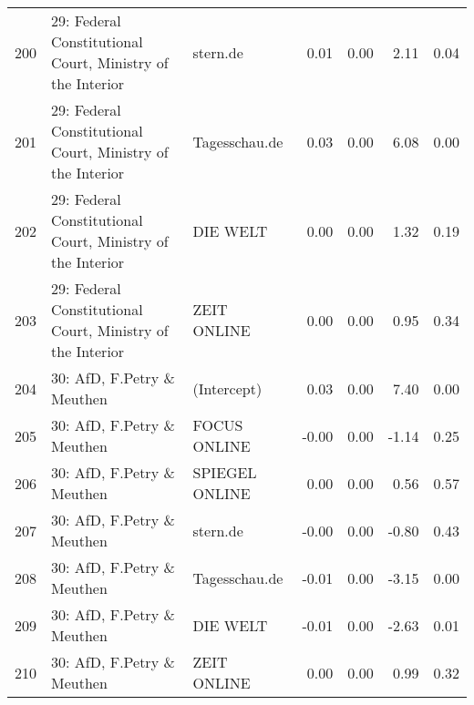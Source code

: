 \begin{table}[ht]
{\begin{tabular}{rllrrrr}
  200 & 29: Federal Constitutional Court, Ministry of the Interior & stern.de & 0.01 & 0.00 & 2.11 & 0.04 \\ 
  201 & 29: Federal Constitutional Court, Ministry of the Interior & Tagesschau.de & 0.03 & 0.00 & 6.08 & 0.00 \\ 
  202 & 29: Federal Constitutional Court, Ministry of the Interior & DIE WELT & 0.00 & 0.00 & 1.32 & 0.19 \\ 
  203 & 29: Federal Constitutional Court, Ministry of the Interior & ZEIT ONLINE & 0.00 & 0.00 & 0.95 & 0.34 \\ 
  204 & 30: AfD, F.Petry \& Meuthen & (Intercept) & 0.03 & 0.00 & 7.40 & 0.00 \\ 
  205 & 30: AfD, F.Petry \& Meuthen & FOCUS ONLINE & -0.00 & 0.00 & -1.14 & 0.25 \\ 
  206 & 30: AfD, F.Petry \& Meuthen & SPIEGEL ONLINE & 0.00 & 0.00 & 0.56 & 0.57 \\ 
  207 & 30: AfD, F.Petry \& Meuthen & stern.de & -0.00 & 0.00 & -0.80 & 0.43 \\ 
  208 & 30: AfD, F.Petry \& Meuthen & Tagesschau.de & -0.01 & 0.00 & -3.15 & 0.00 \\ 
  209 & 30: AfD, F.Petry \& Meuthen & DIE WELT & -0.01 & 0.00 & -2.63 & 0.01 \\ 
  210 & 30: AfD, F.Petry \& Meuthen & ZEIT ONLINE & 0.00 & 0.00 & 0.99 & 0.32 \\ 
   \hline
\end{tabular}
}
\end{table}
